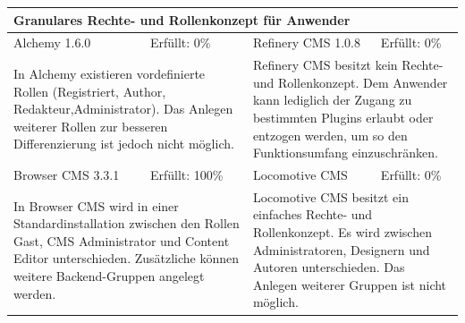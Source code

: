 \begin{tabular}[!ht]{|l|l|l|l|}
\hline
\multicolumn{4}{|p{15cm}|}{\textbf{Granulares Rechte- und Rollenkonzept für Anwender}} \\
\hline
  Alchemy 1.6.0 & \cellcolor{red}Erfüllt: 0\% & Refinery CMS 1.0.8 & \cellcolor{red}Erfüllt: 0\% \\
  \hline
  \multicolumn{2}{|p{7.5cm}|}{In Alchemy existieren vordefinierte Rollen (Registriert, Author, Redakteur,Administrator). Das Anlegen weiterer Rollen zur besseren Differenzierung ist jedoch nicht möglich.}
   & \multicolumn{2}{p{7.5cm}|}{Refinery CMS besitzt kein Rechte- und Rollenkonzept. Dem Anwender kann lediglich der Zugang zu bestimmten Plugins erlaubt oder entzogen werden, um so den Funktionsumfang einzuschränken.} \\
  \hline
  Browser CMS 3.3.1 & \cellcolor{green}Erfüllt: 100\% & Locomotive CMS & \cellcolor{red}Erfüllt: 0\% \\
  \hline
  \multicolumn{2}{|p{7.5cm}|}{In Browser CMS wird in einer Standardinstallation zwischen den Rollen Gast, CMS Administrator und Content Editor unterschieden. Zusätzliche können weitere Backend-Gruppen angelegt werden.} & \multicolumn{2}{p{7.5cm}|}{Locomotive CMS besitzt ein einfaches Rechte- und Rollenkonzept. Es wird zwischen Administratoren, Designern und Autoren unterschieden. Das Anlegen weiterer Gruppen ist nicht möglich.} \\
\hline
\end{tabular}
\newline
\newline
\newline
